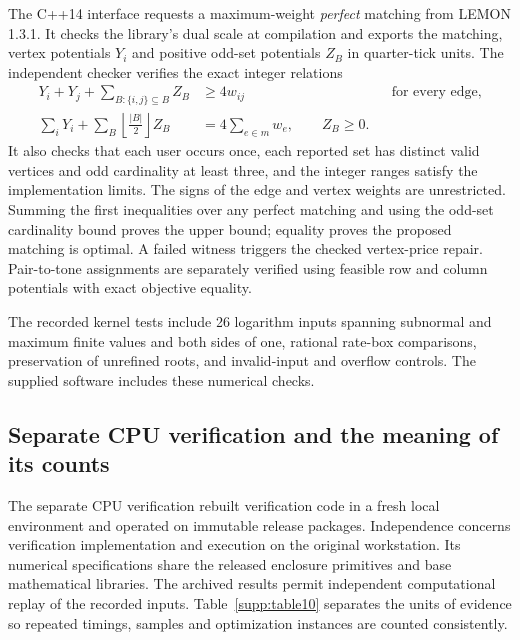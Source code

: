 \documentclass[10pt,letterpaper]{article}
\begin{document}
The C++14 interface requests a maximum-weight \emph{perfect} matching from LEMON 1.3.1. It checks the library's dual scale at compilation and exports the matching, vertex potentials \(Y_i\) and positive odd-set potentials \(Z_B\) in quarter-tick units. The independent checker verifies the exact integer relations
\begin{equation}
 \begin{aligned}
 Y_i+Y_j+\sum_{B:\{i,j\}\subseteq B}Z_B&\geq4w_{ij}
                   &&\text{for every edge},\\
 \sum_iY_i+\sum_B\left\lfloor\frac{|B|}{2}\right\rfloor Z_B
                &=4\sum_{e\in m}w_e,\qquad Z_B\geq0 .
 \end{aligned}
 \label{supp:eq:quartertick}
\end{equation}
It also checks that each user occurs once, each reported set has distinct valid vertices and odd cardinality at least three, and the integer ranges satisfy the implementation limits. The signs of the edge and vertex weights are unrestricted. Summing the first inequalities over any perfect matching and using the odd-set cardinality bound proves the upper bound; equality proves the proposed matching is optimal. A failed witness triggers the checked vertex-price repair. Pair-to-tone assignments are separately verified using feasible row and column potentials with exact objective equality.

The recorded kernel tests include 26 logarithm inputs spanning subnormal and maximum finite values and both sides of one, rational rate-box comparisons, preservation of unrefined roots, and invalid-input and overflow controls. The supplied software includes these numerical checks.

\clearpage
\subsection*{Separate CPU verification and the meaning of its counts}
The separate CPU verification rebuilt verification code in a fresh local environment
and operated on immutable release packages. Independence concerns verification
implementation and execution on the original workstation. Its numerical
specifications share the released enclosure primitives and base mathematical
libraries. The archived results permit independent computational replay of the recorded inputs. Table~\ref{supp:table10} separates the
units of evidence so repeated timings, samples and optimization instances
are counted consistently.
\end{document}
